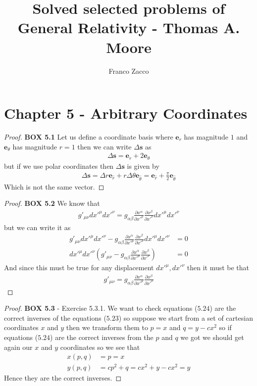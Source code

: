 \documentclass[11pt]{article}
\title{\textbf{Solved selected problems of General Relativity - Thomas A. Moore}}
\author{Franco Zacco}
\date{}
\newcommand{\er}{\bm{e}_r}
\newcommand{\etht}{\bm{e}_\theta}
\theoremstyle{definition}
\begin{document}
\maketitle
\thispagestyle{empty}

\section*{Chapter 5 - Arbitrary Coordinates}

\begin{proof}{\textbf{BOX 5.1}}
    Let us define a coordinate basis where  $\er$ has magnitude $1$ and $\etht$
    has magnitude $r=1$ then we can write $\Delta \bm{s}$ as
    \begin{align*}
        \Delta \bm{s} = \er + 2\etht
    \end{align*}
    but if we use polar coordinates then $\Delta \bm{s}$ is given by
    \begin{align*}
        \Delta \bm{s} = \Delta r \bm{e}_{\hat{r}} + r\Delta \theta \bm{e}_{\hat{\theta}}
            = \bm{e}_{\hat{r}} + \frac{\pi}{2}\bm{e}_{\hat{\theta}}
    \end{align*}
    Which is not the same vector.
\end{proof}
\begin{proof}{\textbf{BOX 5.2}}
    We know that
    \begin{align*}
        g'_{\mu\nu} dx'^\mu dx'^\nu
        = g_{\alpha\beta} \frac{\partial x^\alpha}{\partial x'^\mu}
        \frac{\partial x^\beta}{\partial x'^\nu} dx'^\mu dx'^\nu
    \end{align*}
    but we can write it as
    \begin{align*}
        g'_{\mu\nu} dx'^\mu dx'^\nu
        - g_{\alpha\beta} \frac{\partial x^\alpha}{\partial x'^\mu}
        \frac{\partial x^\beta}{\partial x'^\nu} dx'^\mu dx'^\nu &= 0\\
        dx'^\mu dx'^\nu \left(g'_{\mu\nu} 
        - g_{\alpha\beta} \frac{\partial x^\alpha}{\partial x'^\mu}
        \frac{\partial x^\beta}{\partial x'^\nu}\right) &= 0
    \end{align*}
    And since this must be true for any displacement $dx'^\mu, dx'^\nu$
    then it must be that
    \begin{align*}
    g'_{\mu\nu} 
    = g_{\alpha\beta} \frac{\partial x^\alpha}{\partial x'^\mu}
    \frac{\partial x^\beta}{\partial x'^\nu}
    \end{align*}
\end{proof}
\cleardoublepage
\begin{proof}{\textbf{BOX 5.3} - Exercise 5.3.1.}
    We want to check equations ($5.24$) are the correct inverses of the
    equations ($5.23$) so suppose we start from a set of cartesian coordinates
    $x$ and $y$ then we transform them to $p = x$ and $q = y - cx^2$
    so if equations ($5.24$) are the correct inverses from the $p$ and $q$ we
    got we should get again our $x$ and $y$ coordinates so we see that
    \begin{align*}
        x(p, q) &= p = x\\
        y(p, q) &= cp^2 + q = cx^2 + y - cx^2 = y
    \end{align*}
    Hence they are the correct inverses.
\end{proof}
\end{document}
